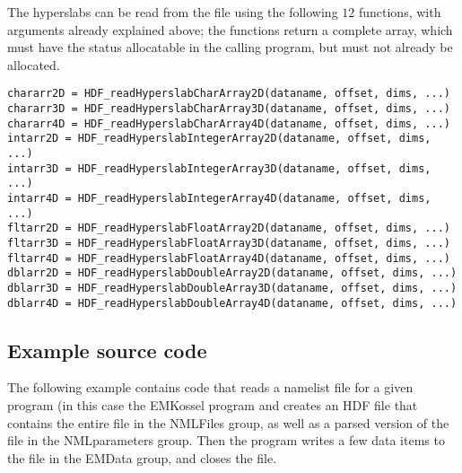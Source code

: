 \documentclass[DIV=calc, paper=letter, fontsize=11pt]{scrartcl}	 %
\begin{document}
The hyperslabs can be read from the file using the following $12$ functions, with arguments already explained above; the
functions return a complete array, which must have the status \textsf{allocatable} in the calling program, but must
not already be allocated.
\begin{verbatim}
chararr2D = HDF_readHyperslabCharArray2D(dataname, offset, dims, ...)
chararr3D = HDF_readHyperslabCharArray3D(dataname, offset, dims, ...)
chararr4D = HDF_readHyperslabCharArray4D(dataname, offset, dims, ...)
intarr2D = HDF_readHyperslabIntegerArray2D(dataname, offset, dims, ...)
intarr3D = HDF_readHyperslabIntegerArray3D(dataname, offset, dims, ...)
intarr4D = HDF_readHyperslabIntegerArray4D(dataname, offset, dims, ...)
fltarr2D = HDF_readHyperslabFloatArray2D(dataname, offset, dims, ...)
fltarr3D = HDF_readHyperslabFloatArray3D(dataname, offset, dims, ...)
fltarr4D = HDF_readHyperslabFloatArray4D(dataname, offset, dims, ...)
dblarr2D = HDF_readHyperslabDoubleArray2D(dataname, offset, dims, ...)
dblarr3D = HDF_readHyperslabDoubleArray3D(dataname, offset, dims, ...)
dblarr4D = HDF_readHyperslabDoubleArray4D(dataname, offset, dims, ...) 
\end{verbatim}





\subsection{Example source code}
The following example contains code that reads a namelist file for a given program (in this case the \textsf{EMKossel} program
and creates an HDF file that contains the entire file in the \textsf{NMLFiles} group, as well as a parsed version of the 
file in the \textsf{NMLparameters} group.  Then the program writes a few data items to the file in the \textsf{EMData} group, 
and closes the file.
\end{document}
